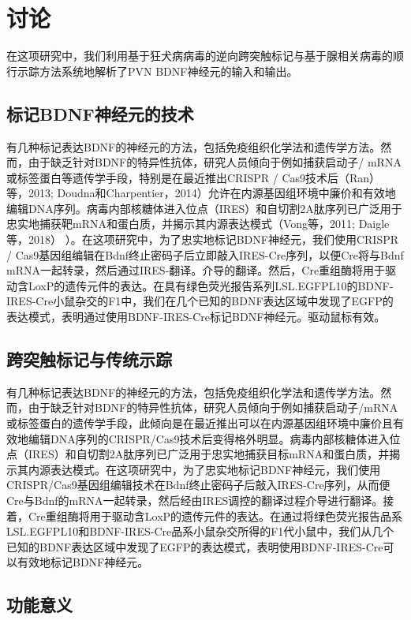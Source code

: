 \chapter{讨论}\label{chap:discussion}
在这项研究中，我们利用基于狂犬病病毒的逆向跨突触标记与基于腺相关病毒的顺行示踪方法系统地解析了PVN BDNF神经元的输入和输出。

\section{标记BDNF神经元的技术}
有几种标记表达BDNF的神经元的方法，包括免疫组织化学法和遗传学方法。然而，由于缺乏针对BDNF的特异性抗体，研究人员倾向于例如捕获启动子/ mRNA或标签蛋白等遗传学手段，特别是在最近推出CRISPR / Cas9技术后（Ran）
等，2013; Doudna和Charpentier，2014）允许在内源基因组环境中廉价和有效地编辑DNA序列。病毒内部核糖体进入位点（IRES）和自切割2A肽序列已广泛用于忠实地捕获靶mRNA和蛋白质，并揭示其内源表达模式（Vong等，2011; Daigle等，2018） ）。在这项研究中，为了忠实地标记BDNF神经元，我们使用CRISPR / Cas9基因组编辑在Bdnf终止密码子后立即敲入IRES-Cre序列，以便Cre将与Bdnf mRNA一起转录，然后通过IRES-翻译。介导的翻译。然后，Cre重组酶将用于驱动含LoxP的遗传元件的表达。在具有绿色荧光报告系列LSL.EGFPL10的BDNF-IRES-Cre小鼠杂交的F1中，我们在几个已知的BDNF表达区域中发现了EGFP的表达模式，表明通过使用BDNF-IRES-Cre标记BDNF神经元。驱动鼠标有效。

\section{跨突触标记与传统示踪}
有几种标记表达BDNF的神经元的方法，包括免疫组织化学法和遗传学方法。然而，由于缺乏针对BDNF的特异性抗体，研究人员倾向于例如捕获启动子/mRNA或标签蛋白的遗传学手段，此倾向是在最近推出可以在内源基因组环境中廉价且有效地编辑DNA序列的CRISPR/Cas9技术后\citep{ran2013genome, doudna2014new}变得格外明显。病毒内部核糖体进入位点（IRES）和自切割2A肽序列已广泛用于忠实地捕获目标mRNA和蛋白质，并揭示其内源表达模式\citep{vong2011leptin, daigle2018suite}。在这项研究中，为了忠实地标记BDNF神经元，我们使用CRISPR/Cas9基因组编辑技术在Bdnf终止密码子后敲入IRES-Cre序列，从而便Cre与Bdnf的mRNA一起转录，然后经由IRES调控的翻译过程介导进行翻译。接着，Cre重组酶将用于驱动含LoxP的遗传元件的表达。在通过将绿色荧光报告品系LSL.EGFPL10和BDNF-IRES-Cre品系小鼠杂交所得的F1代小鼠中，我们从几个已知的BDNF表达区域中发现了EGFP的表达模式，表明使用BDNF-IRES-Cre可以有效地标记BDNF神经元。

\section{功能意义}


